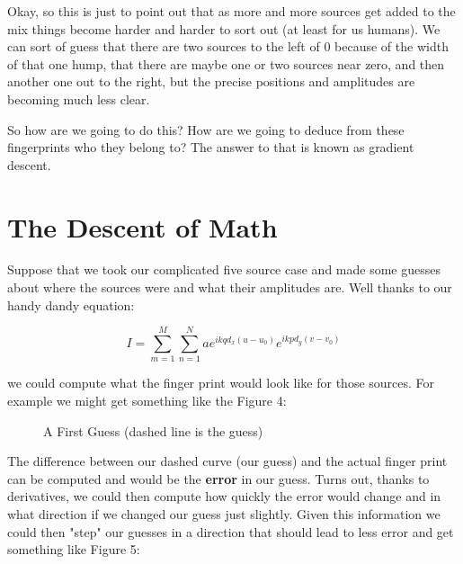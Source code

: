 \documentclass[10pt,a5paper]{book}
\begin{document}
Okay, so this is just to point out that as more and more sources get added to the mix things become harder and harder to sort out (at least for us humans). We can sort of guess that there are two sources to the left of 0 because of the width of that one hump, that there are maybe one or two sources near zero, and then another one out to the right, but the precise positions and amplitudes are becoming much less clear. 

So how are we going to do this? How are we going to deduce from these fingerprints who they belong to? The answer to that is known as gradient descent. 

\section{The Descent of Math}
Suppose that we took our complicated five source case and made some guesses about where the sources were and what their amplitudes are. Well thanks to our handy dandy equation:

\begin{equation}
I=\sum_{m=1}^M \sum_{n=1}^N  ae^{ikqd_x(u-u_0)}e^{ikpd_y(v-v_0)}
\end{equation}

we could compute what the finger print would look like for those sources. For example we might get something like the Figure 4:

\begin{figure}[!htb]
\caption{\label{fig:my-label} A First Guess (dashed line is the guess)}
\end{figure}

The difference between our dashed curve (our guess) and the actual finger print can be computed and would be the \textbf{error} in our guess. Turns out, thanks to derivatives, we could then compute how quickly the error would change and in what direction if we changed our guess just slightly. Given this information we could then "step" our guesses in a direction that should lead to less error and get something like Figure 5: 
\end{document}
